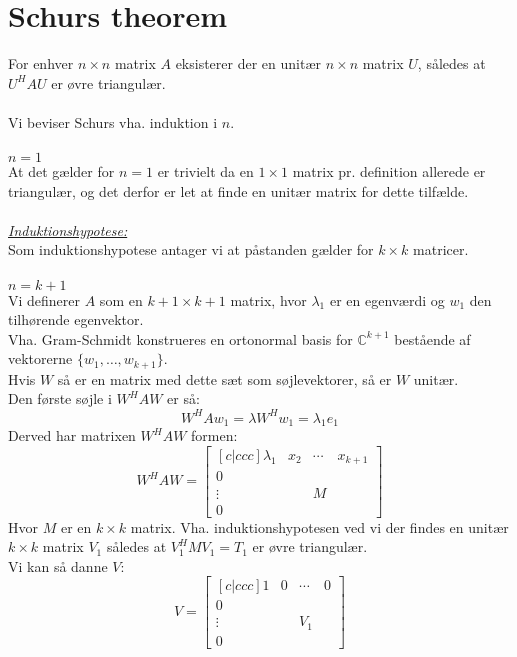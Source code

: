 \documentclass[a4paper,oneside,article]{memoir}
\begin{document}
	\section{Schurs theorem}
	For enhver $n \times n$ matrix $A$ eksisterer der
	en unitær $n \times n$ matrix $U$, således at 
	$U^HAU$ er øvre triangulær.
	\\
	\\
	Vi beviser Schurs vha. induktion i $n$.
	\\
	\\
	\underline{$n=1$}\\
	At det gælder for $n=1$ er trivielt da en $1 \times 1$
	matrix pr. definition allerede er triangulær, og det
	derfor er let at finde en unitær matrix for dette
	tilfælde.
	\\
	\\
	\textit{\underline{Induktionshypotese:}}\\
	Som induktionshypotese antager vi at påstanden gælder
	for $k \times k$ matricer.
	\\
	\\
	\underline{$n=k+1$}\\
	Vi definerer $A$ som en $k+1 \times k+1$ matrix, hvor
	$\lambda_1$ er en egenværdi og $w_1$ den tilhørende
	egenvektor.\\
	Vha. Gram-Schmidt konstrueres en ortonormal basis for 
	$\mathbb{C}^{k+1}$ bestående af vektorerne
	$\{w_1,\dots,w_{k+1}\}$.\\
	Hvis $W$ så er en matrix med dette sæt som søjlevektorer,
	så er $W$ unitær.\\
	Den første søjle i $W^HAW$ er så:
	$$W^HAw_1=\lambda W^Hw_1=\lambda_1e_1$$
	Derved har matrixen $W^HAW$ formen:
	$$W^HAW=\begin{bmatrix}[c|ccc]
	\lambda_1 & x_2 & \cdots & x_{k+1} \\ \hline
	0 & & & \\
	\vdots & & M & \\
	0 & & &
	\end{bmatrix}$$
	Hvor $M$ er en $k \times k$ matrix. Vha. induktionshypotesen
	ved vi der findes en unitær $k \times k$ matrix $V_1$ 
	således at $V_1^HMV_1=T_1$ er øvre triangulær.\\
	Vi kan så danne $V$:
	$$V=\begin{bmatrix}[c|ccc]
		1 & 0 & \cdots & 0 \\ \hline
		0 & & & \\
		\vdots & & V_1 & \\
		0 & & &
		\end{bmatrix}$$
\end{document}
